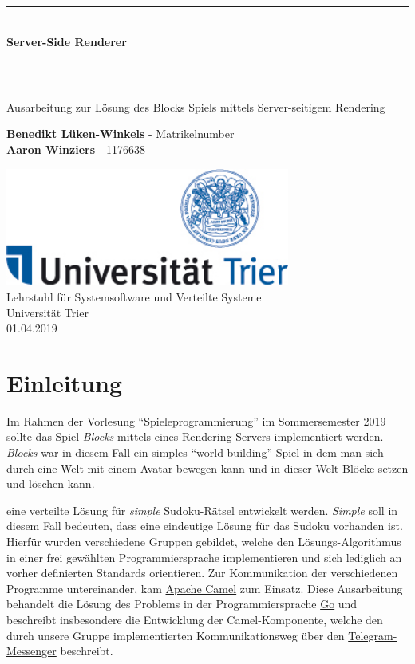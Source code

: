 \documentclass[11pt,parskip=full]{scrartcl}
\newcommand{\HRule}[1]{\rule{\linewidth}{#1}}
\begin{document}
\begin{titlepage}
  \begin{center}
    \vspace*{2cm}
    \HRule{1pt} \\
    \vspace{.5 cm}
    \textbf{\Huge Server-Side Renderer}
    \HRule{2pt} \\ [1cm]

    \vspace{1.5cm}

    \Large{
      Ausarbeitung zur Lösung des Blocks Spiels mittels Server-seitigem Rendering
    }
    \vspace{1.5cm}

    \textbf{\Large Benedikt Lüken-Winkels} - \large Matrikelnumber \\
    [3pt]
    \textbf{\Large Aaron Winziers} - \large 1176638

    \vfill

    \includegraphics[width=0.7\textwidth]{Logo-Uni-Trier}\\
    [1cm]
    Lehrstuhl für Systemsoftware und Verteilte Systeme\\
    Universität Trier\\
    01.04.2019

  \end{center}
\end{titlepage}
\newpage

\section{Einleitung}

Im Rahmen der Vorlesung ``Spieleprogrammierung'' im Sommersemester 2019 sollte das Spiel \textit{Blocks} mittels eines Rendering-Servers implementiert werden. \textit{Blocks} war in diesem Fall ein simples ``world building'' Spiel in dem man sich durch eine Welt mit einem Avatar bewegen kann und in dieser Welt Blöcke setzen und löschen kann.

eine verteilte Lösung für \textit{simple} Sudoku-Rätsel entwickelt werden. \textit{Simple} soll in diesem Fall bedeuten, dass eine eindeutige Lösung für das Sudoku vorhanden ist. Hierfür wurden verschiedene Gruppen gebildet, welche den Lösungs-Algorithmus in einer frei gewählten Programmiersprache implementieren und sich lediglich an vorher definierten Standards orientieren. Zur Kommunikation der verschiedenen Programme untereinander, kam \href{http://camel.apache.org/}{Apache Camel} zum Einsatz. Diese Ausarbeitung behandelt die Lösung des Problems in der Programmiersprache \href{https://golang.org/}{Go} und beschreibt insbesondere die Entwicklung der Camel-Komponente, welche den durch unsere Gruppe implementierten Kommunikationsweg über den \href{https://telegram.org/}{Telegram-Messenger} beschreibt.
\end{document}
